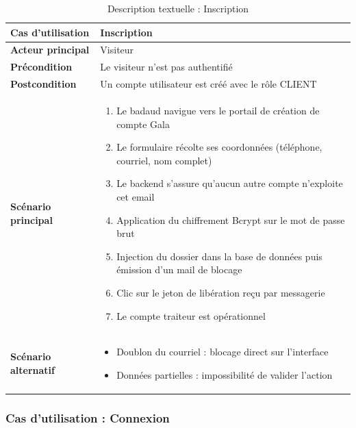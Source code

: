 \begin{table}[H]
    \centering
    \caption{Description textuelle : Inscription}
    \label{tab:desc_inscription}
    \renewcommand{\arraystretch}{1.3}
    \begin{tabular}{|p{4cm}|p{8.5cm}|}
        \hline
        \textbf{Cas d'utilisation} & Inscription \\
        \hline
        \textbf{Acteur principal} & Visiteur \\
        \hline
        \textbf{Précondition} & Le visiteur n'est pas authentifié \\
        \hline
        \textbf{Postcondition} & Un compte utilisateur est créé avec le rôle CLIENT \\
        \hline
        \textbf{Scénario principal} &
        \begin{enumerate}
            \item Le badaud navigue vers le portail de création de compte Gala
            \item Le formulaire récolte ses coordonnées (téléphone, courriel, nom complet)
            \item Le backend s'assure qu'aucun autre compte n'exploite cet email
            \item Application du chiffrement Bcrypt sur le mot de passe brut
            \item Injection du dossier dans la base de données puis émission d'un mail de blocage
            \item Clic sur le jeton de libération reçu par messagerie
            \item Le compte traiteur est opérationnel
        \end{enumerate} \\
        \hline
        \textbf{Scénario alternatif} &
        \begin{itemize}
            \item[3a.] Doublon du courriel : blocage direct sur l'interface
            \item[2a.] Données partielles : impossibilité de valider l'action
        \end{itemize} \\
        \hline
    \end{tabular}
\end{table}

\subsubsection{Cas d'utilisation : Connexion}

